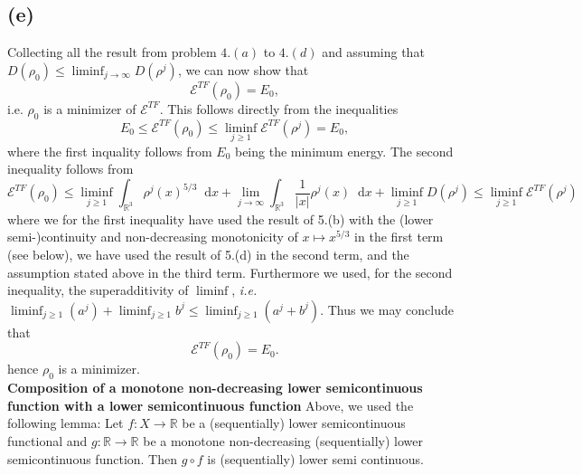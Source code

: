 \documentclass[a4paper,11pt]{article}
\newcommand{\abs}[1]{\left\lvert #1 \right\rvert}
\newcommand*\diff{\mathop{}\!\mathrm{d}}
\newcommand{\ie}{\emph{i.e.} }
\newcommand{\R}{\mathbb{R}}
\numberwithin{equation}{section}
\begin{document}
\subsection*{(e)}
Collecting all the result from problem $ 4.(a) $ to $ 4.(d) $ and assuming that $ D(\rho_0)\leq\liminf_{j\to\infty}D(\rho^j) $, we can now show that \begin{equation}
\mathcal{E}^{TF}(\rho_0)=E_0,
\end{equation}
i.e. $ \rho_0 $ is a minimizer of $ \mathcal{E}^{TF} $. This follows directly from the inequalities\begin{equation}
E_0\leq\mathcal{E}^{TF}(\rho_0)\leq\liminf_{j\geq1}\mathcal{E}^{TF}(\rho^j)=E_0,
\end{equation}
where the first inquality follows from $ E_0 $ being the minimum energy. The second inequality follows from \begin{equation}
\mathcal{E}^{TF}(\rho_0)\leq\liminf_{j\geq1}\int_{\R^3}\rho^j(x)^{5/3}\diff x+\lim\limits_{j\to\infty}\int_{\R^3}\frac{1}{\abs{x}}\rho^j(x) \diff x+\liminf_{j\geq1}D(\rho^j)\leq\liminf_{j\geq1}\mathcal{E}^{TF}(\rho^j)
\end{equation}
where we for the first inequality have used the result of 5.(b) with the (lower semi-)continuity and non-decreasing monotonicity of $ x\mapsto x^{5/3} $ in the first term (see below), we have used the result of 5.(d) in the second term, and the assumption stated above in the third term. Furthermore we used, for the second inequality, the superadditivity of $ \liminf $, \ie $ \liminf_{j\geq1}(a^j)+\liminf_{j\geq1}b^j\leq\liminf_{j\geq1}(a^j+b^j) $.
Thus we may conclude that \begin{equation}
\mathcal{E}^{TF}(\rho_0)=E_0.
\end{equation}
hence $ \rho_0 $ is a minimizer.\vspace{0.5cm}\\
\textbf{Composition of a monotone non-decreasing lower semicontinuous function with a lower semicontinuous function}
Above, we used the following lemma: Let $ f:X\to\R $ be a (sequentially) lower semicontinuous functional and $ g:\R\to\R $ be a monotone non-decreasing (sequentially) lower semicontinuous function. Then $ g\circ f $ is (sequentially) lower semi continuous.
\end{document}
